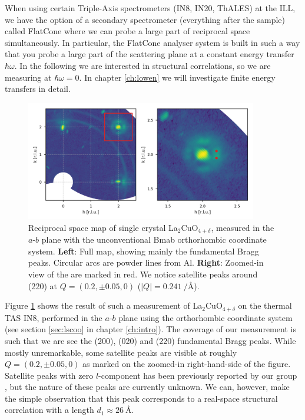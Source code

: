 When using certain Triple-Axis spectrometers (IN8, IN20, ThALES) at the ILL, we have the option of a secondary spectrometer (everything after the sample) called FlatCone \cite{flatcone} where we can probe a large part of reciprocal space simultaneously. In particular, the FlatCone analyser system is built in such a way that you probe a large part of the scattering plane at a constant energy transfer $\hbar\omega$. In the following we are interested in structural correlations, so we are measuring at $\hbar\omega = 0$. In chapter \ref{ch:lowen} we will investigate finite energy transfers in detail.

\begin{figure}
    \centering
    \includegraphics[width=0.9\textwidth]{fig/pdf/lcoo_ab_elastic.png}
    \caption{Reciprocal space map of single crystal La$_2$CuO$_{4+\delta}$, measured in the $a$-$b$ plane with the unconventional Bmab orthorhombic coordinate system. \textbf{Left}: Full map, showing mainly the fundamental Bragg peaks. Circular arcs are powder lines from Al. \textbf{Right}: Zoomed-in view of the are marked in red. We notice satellite peaks around (220) at $Q=(0.2,\pm 0.05,0)$ ($|Q| = \SI{0.241}{\per\angstrom}$).}
    \label{fig:lcoo_ab_elastic}
\end{figure}

Figure \ref{fig:lcoo_ab_elastic} shows the result of such a measurement of La$_2$CuO$_{4+\delta}$ on the thermal TAS IN8, performed in the $a$-$b$ plane using the orthorhombic coordinate system (see section \ref{sec:lscoo} in chapter \ref{ch:intro}). The coverage of our measurement is such that we are see the (200), (020) and (220) fundamental Bragg peaks. While mostly unremarkable, some satellite peaks are visible at roughly $Q = (0.2, \pm 0.05, 0)$ as marked on the zoomed-in right-hand-side of the figure. Satellite peaks with zero $l$-component has been previously reported by our group \cite{Ray2016}, but the nature of these peaks are currently unknown. We can, however, make the simple observation that this peak corresponds to a real-space structural correlation with a length $d_1 \approx \SI{26}{\angstrom}$.

